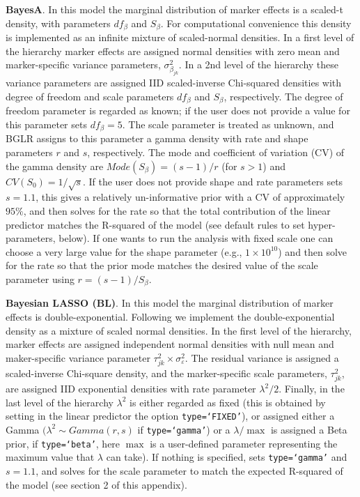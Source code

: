 \documentclass[article,shortnames,nojss]{jss}
\begin{document}
\textbf{BayesA}. In this model the marginal distribution 
of marker effects is a scaled-t density, with parameters 
$df_\beta$ and $S_\beta$. For computational convenience 
this density is implemented as an infinite mixture 
of scaled-normal densities. In a first level of the hierarchy 
marker effects are assigned normal densities with 
zero mean and marker-specific variance parameters, 
$\sigma_{\beta_{jk}}^2$. In a 2nd level of the hierarchy 
these variance parameters are assigned IID scaled-inverse 
Chi-squared densities with degree of freedom and 
scale parameters $df_\beta$ and $S_\beta$, respectively. The 
degree of freedom parameter is regarded as known; 
if the user does not provide a value for this parameter  sets $df_\beta=5$. The scale parameter 
is treated as unknown, and BGLR assigns to this parameter 
a gamma density with rate and shape parameters $r$ and $s$, 
respectively. The mode and coefficient of variation 
(CV) of the gamma density are $Mode(S_\beta)=(s-1)/r$ (for $s>1$) 
and $CV(S_0)=1/\sqrt{s}$. If the user does not provide shape and 
rate parameters  sets $s=1.1$, this gives a relatively 
un-informative prior with a CV of approximately $95\%$, and 
then solves for the rate so that the total contribution of 
the linear predictor matches the R-squared of the model 
(see default rules to set hyper-parameters, below). If one 
wants to run the analysis with fixed scale one can choose 
a very large value for the shape parameter (e.g., $1 \times10^{10}$)  
and then solve for the rate so that the prior mode matches 
the desired value of the scale parameter using $r=(s-1)/S_\beta$.

\textbf{Bayesian LASSO (BL)}. In this model the marginal 
distribution of marker effects is double-exponential. 
Following \citet{Park:2008} we implement the double-exponential 
density as a mixture of scaled normal densities. In the first 
level of the hierarchy, marker effects are assigned 
independent normal densities with null mean and 
maker-specific variance parameter $\tau_{jk}^2 \times \sigma_\varepsilon^2$. 
The residual variance is assigned a scaled-inverse 
Chi-square density, and the marker-specific scale parameters, $\tau_{jk}^2$, 
are assigned IID exponential densities with rate parameter $\lambda^2/2$. 
Finally, in the last level of the hierarchy $\lambda^2$ is either 
regarded as fixed (this is obtained by setting in the 
linear predictor the option \texttt{type=`FIXED'}), or 
assigned either a Gamma $(\lambda^2 \sim Gamma(r,s)$ 
if \texttt{type=`gamma'}) or a $\lambda/\max$ is assigned a Beta prior, 
if \texttt{type=`beta'}, here $\max$ is a user-defined parameter 
representing the maximum value that $\lambda$ can take). If 
nothing is specified,  sets  \texttt{type=`gamma'} and $s=1.1$, and 
solves for the scale parameter to match the 
expected R-squared of the model (see section 2 of this appendix).
\end{document}

